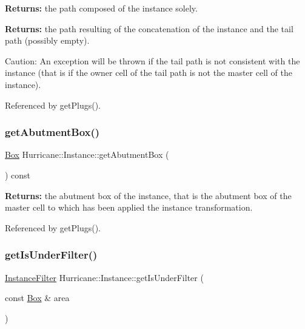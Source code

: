 {\bfseries Returns\+:} the path composed of the instance solely.

{\bfseries Returns\+:} the path resulting of the concatenation of the instance and the tail path (possibly empty).

\begin{DoxyParagraph}{Caution\+:}
An exception will be thrown if the tail path is not consistent with the instance (that is if the owner cell of the tail path is not the master cell of the instance). 
\end{DoxyParagraph}


Referenced by get\+Plugs().

\mbox{\label{classHurricane_1_1Instance_a29bedbd05939bf43757ef036bb506d01}} 
\subsubsection{\texorpdfstring{get\+Abutment\+Box()}{getAbutmentBox()}}
{\footnotesize\ttfamily \hyperlink{classHurricane_1_1Box}{Box} Hurricane\+::\+Instance\+::get\+Abutment\+Box (\begin{DoxyParamCaption}{ }\end{DoxyParamCaption}) const}

{\bfseries Returns\+:} the abutment box of the instance, that is the abutment box of the master cell to which has been applied the instance transformation. 

Referenced by get\+Plugs().

\mbox{\label{classHurricane_1_1Instance_ae2bc936dfecfaf70a0052959b4b2861e}} 
\subsubsection{\texorpdfstring{get\+Is\+Under\+Filter()}{getIsUnderFilter()}}
{\footnotesize\ttfamily \hyperlink{namespaceHurricane_a889ec1441e1876d9addf89dfab32e772}{Instance\+Filter} Hurricane\+::\+Instance\+::get\+Is\+Under\+Filter (\begin{DoxyParamCaption}\item[{const \hyperlink{classHurricane_1_1Box}{Box} \&}]{area }\end{DoxyParamCaption})\hspace{0.3cm}{\ttfamily [static]}}

